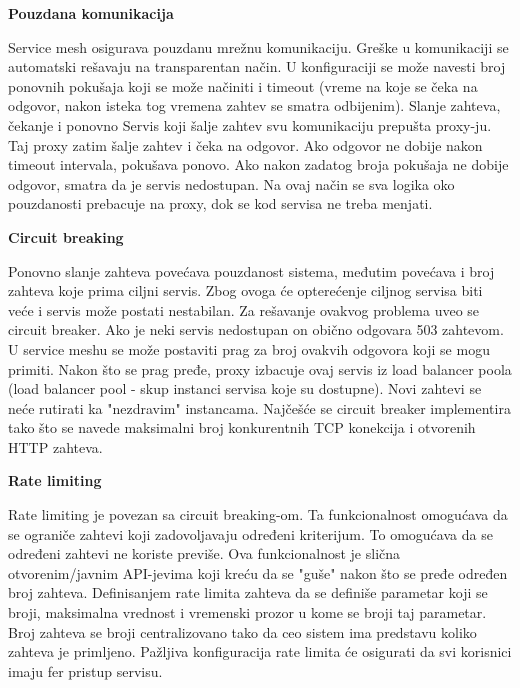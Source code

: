 \documentclass[a4paper,12pt]{report}
\begin{document}
\textbf{Pouzdana komunikacija}\newline

Service mesh osigurava pouzdanu mrežnu komunikaciju. Greške u komunikaciji se automatski rešavaju na transparentan način. U konfiguraciji se može navesti broj ponovnih pokušaja koji se može načiniti i timeout (vreme na koje se čeka na odgovor, nakon isteka tog vremena zahtev se smatra odbijenim). Slanje zahteva, čekanje i ponovno  Servis koji šalje zahtev svu komunikaciju prepušta proxy-ju. Taj proxy zatim šalje zahtev i čeka na odgovor. Ako odgovor ne dobije nakon timeout intervala, pokušava ponovo. Ako nakon zadatog broja pokušaja ne dobije odgovor, smatra da je servis nedostupan.  Na ovaj način se sva logika oko pouzdanosti prebacuje na proxy, dok se kod servisa ne treba menjati. \newline

\textbf{Circuit breaking}\newline

Ponovno slanje zahteva povećava pouzdanost sistema, međutim povećava i broj zahteva koje prima ciljni servis. Zbog ovoga će opterećenje ciljnog servisa biti veće i servis može postati nestabilan. Za rešavanje ovakvog problema uveo se circuit breaker. Ako je neki servis nedostupan on obično odgovara 503 zahtevom. U service meshu se može postaviti prag za broj ovakvih odgovora koji se mogu primiti. Nakon što se prag pređe, proxy izbacuje ovaj servis iz load balancer poola (load balancer pool - skup instanci servisa koje su dostupne). Novi zahtevi se neće rutirati ka "nezdravim" instancama. Najčešće se circuit breaker implementira tako što se navede maksimalni broj konkurentnih TCP konekcija i otvorenih HTTP zahteva. \newline

\textbf{Rate limiting}\newline

Rate limiting je povezan sa circuit breaking-om. Ta funkcionalnost omogućava da se ograniče zahtevi koji zadovoljavaju određeni kriterijum. To omogućava da se određeni zahtevi ne koriste previše. Ova funkcionalnost je slična otvorenim/javnim API-jevima koji kreću da se "guše" nakon što se pređe određen broj zahteva. Definisanjem rate limita zahteva da se definiše parametar koji se broji, maksimalna vrednost i vremenski prozor u kome se broji taj parametar. Broj zahteva se broji centralizovano tako da ceo sistem ima predstavu koliko zahteva je primljeno. Pažljiva konfiguracija rate limita će osigurati da svi korisnici imaju fer pristup servisu. \newline
\end{document}
